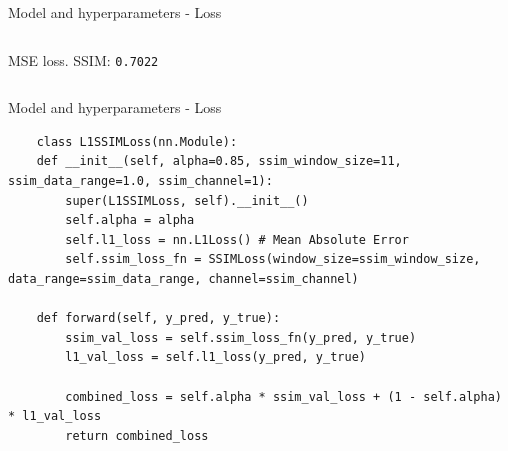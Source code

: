\documentclass[footline=authortitle]{beamer}
\begin{document}
\begin{frame}{Model and hyperparameters - Loss}
\begin{columns}
            \newline
            \centering \small MSE loss. SSIM: \texttt{0.7022}
    \end{columns}
\end{frame}

\begin{frame}[fragile]{Model and hyperparameters - Loss}
    \begin{lstlisting}
    class L1SSIMLoss(nn.Module):
    def __init__(self, alpha=0.85, ssim_window_size=11, ssim_data_range=1.0, ssim_channel=1):
        super(L1SSIMLoss, self).__init__()
        self.alpha = alpha
        self.l1_loss = nn.L1Loss() # Mean Absolute Error
        self.ssim_loss_fn = SSIMLoss(window_size=ssim_window_size, data_range=ssim_data_range, channel=ssim_channel)

    def forward(self, y_pred, y_true):
        ssim_val_loss = self.ssim_loss_fn(y_pred, y_true)
        l1_val_loss = self.l1_loss(y_pred, y_true)
        
        combined_loss = self.alpha * ssim_val_loss + (1 - self.alpha) * l1_val_loss
        return combined_loss
    \end{lstlisting}
\end{frame}
\end{document}
